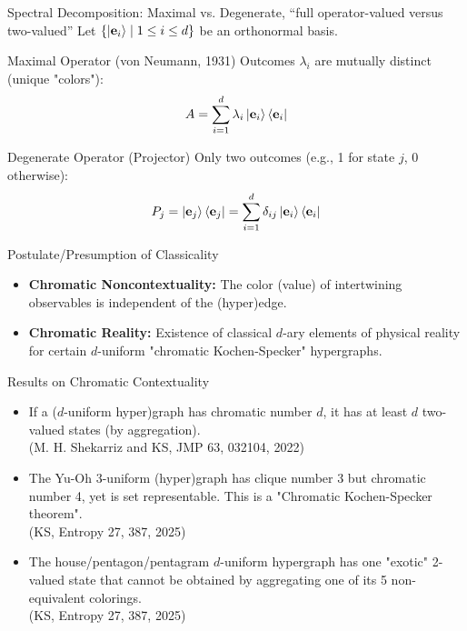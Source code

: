 \documentclass{beamer}
\begin{document}
\begin{frame}{Spectral Decomposition: Maximal vs. Degenerate, ``full operator-valued versus two-valued'' }
    Let $\{\ket{\mathbf{e}_i} \mid 1 \le i \le d\}$ be an orthonormal basis.
    \begin{block}{Maximal Operator (von Neumann, 1931)}
    Outcomes $\lambda_i$ are mutually distinct (unique "colors"):
    \[ A = \sum_{i=1}^d \lambda_i \ket{\mathbf{e}_i}\bra{\mathbf{e}_i} \]
    \end{block}
    \pause
    \begin{block}{Degenerate Operator (Projector)}
    Only two outcomes (e.g., 1 for state $j$, 0 otherwise):
    \[ P_j = \ket{\mathbf{e}_j}\bra{\mathbf{e}_j} = \sum_{i=1}^d \delta_{ij} \ket{\mathbf{e}_i}\bra{\mathbf{e}_i} \]
    \end{block}
\end{frame}

\begin{frame}{Postulate/Presumption of Classicality}
\begin{itemize}
        \item \textbf{Chromatic Noncontextuality:} The color (value) of intertwining observables is independent of the (hyper)edge.
        \item \textbf{Chromatic Reality:} Existence of classical $d$-ary elements of physical reality for certain $d$-uniform
"chromatic Kochen-Specker" hypergraphs.
    \end{itemize}
\end{frame}

\begin{frame}{Results on Chromatic Contextuality}
    \begin{itemize}[<+->] %
        \item If a ($d$-uniform hyper)graph has chromatic number $d$, it has at least $d$ two-valued states (by aggregation). \\ \footnotesize (M. H. Shekarriz and KS, JMP 63, 032104, 2022)
        \item The Yu-Oh 3-uniform (hyper)graph has clique number 3 but chromatic number 4, yet is set representable. This is a "Chromatic Kochen-Specker theorem". \\ \footnotesize (KS, Entropy 27, 387, 2025)
        \item The house/pentagon/pentagram $d$-uniform hypergraph has one "exotic" 2-valued state that cannot be obtained by aggregating one of its 5 non-equivalent colorings. \\ \footnotesize (KS, Entropy 27, 387, 2025)
    \end{itemize}
\end{frame}
\end{document}
